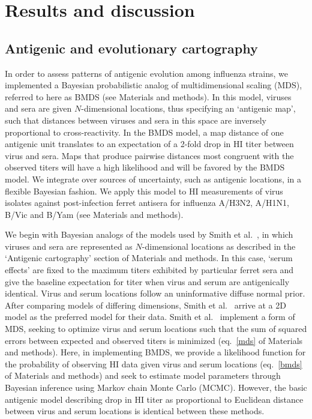 \documentclass[11pt,oneside,letterpaper]{article}
\begin{document}
\section*{Results and discussion}

\subsection*{Antigenic and evolutionary cartography}

In order to assess patterns of antigenic evolution among influenza strains, we implemented a Bayesian probabilistic analog of multidimensional scaling (MDS), referred to here as BMDS (see Materials and methods).
In this model, viruses and sera are given $N$-dimensional locations, thus specifying an `antigenic map', such that distances between viruses and sera in this space are inversely proportional to cross-reactivity.
In the BMDS model, a map distance of one antigenic unit translates to an expectation of a 2-fold drop in HI titer between virus and sera.
Maps that produce pairwise distances most congruent with the observed titers will have a high likelihood and will be favored by the BMDS model.
We integrate over sources of uncertainty, such as antigenic locations, in a flexible Bayesian fashion.
We apply this model to HI measurements of virus isolates against post-infection ferret antisera for influenza A/H3N2, A/H1N1, B/Vic and B/Yam (see Materials and methods).
 
We begin with Bayesian analogs of the models used by Smith et al.\ \cite{Smith04}, in which viruses and sera are represented as $N$-dimensional locations as described in the `Antigenic cartography' section of Materials and methods.
In this case, `serum effects' are fixed to the maximum titers exhibited by particular ferret sera and give the baseline expectation for titer when virus and serum are antigenically identical.
Virus and serum locations follow an uninformative diffuse normal prior. 
After comparing models of differing dimensions, Smith et al.\ \cite{Smith04} arrive at a 2D model as the preferred model for their data.
Smith et al.\ \cite{Smith04} implement a form of MDS, seeking to optimize virus and serum locations such that the sum of squared errors between expected and observed titers is minimized (eq.\ \ref{mds} of Materials and methods).
Here, in implementing BMDS, we provide a likelihood function for the probability of observing HI data given virus and serum locations (eq.\ \ref{bmds} of Materials and methods) and seek to estimate model parameters through Bayesian inference using Markov chain Monte Carlo (MCMC).
However, the basic antigenic model describing drop in HI titer as proportional to Euclidean distance between virus and serum locations is identical between these methods.
\end{document}

